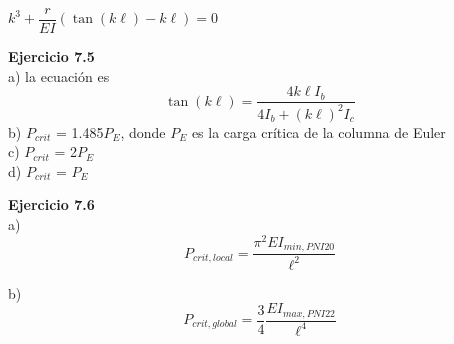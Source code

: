 \indent $k^3 + \dfrac{r}{EI} \left( \tan(k\ell)-k\ell \right) = 0 $\newline

\textbf{Ejercicio 7.5}\\

\indent a) la ecuación es 
$$
\tan(k\ell) = \frac{4 k \ell I_b} {4 I_b + (k\ell)^2 I_c }
$$
\indent b) $P_{crit}$ = 1.485$P_E$, donde $P_E$ es la carga crítica de la columna de Euler\\
\indent c) $P_{crit}$ = 2$P_E$\\
\indent d) $P_{crit}$ = $P_E$


\textbf{Ejercicio 7.6}\\

\indent a) $$P_{crit,local} =  \frac{\pi^2 E I_{min,PNI20}}{\ell^2}$$

\indent b) $$P_{crit,global} =  \frac{3}{4} \frac{E I_{max,PNI22}}{\ell^4}$$

